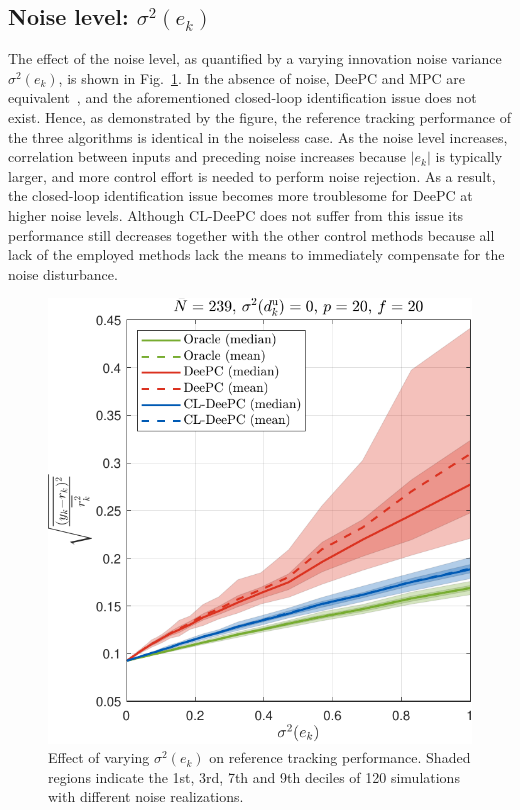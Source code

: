 \subsection{Noise level: $\sigma^2(e_k)$}
\noindent The effect of the noise level, as quantified by a varying innovation noise variance $\sigma^2(e_k)$, is shown in Fig.~\ref{fig:varying_Re}. In the absence of noise, \ac{DeePC} and \ac{MPC} are equivalent~\cite{Coulson2019}, and the aforementioned closed-loop identification issue does not exist. Hence, as demonstrated by the figure, the reference tracking performance of the three algorithms is identical in the noiseless case. As the noise level increases, correlation between inputs and preceding noise increases because $|e_k|$ is typically larger, and more control effort is needed to perform noise rejection. As a result, the closed-loop identification issue becomes more troublesome for \ac{DeePC} at higher noise levels. Although \ac{CL-DeePC} does not suffer from this issue its performance still decreases together with the other control methods because all lack of the employed methods lack the means to immediately compensate for the noise disturbance.
\begin{figure}[t!]
\begin{center}
\includegraphics[width=\columnwidth]{results/figures/Varying_Re_0.0001-1-50_Nbar_239_p_20_f_20_Ru_1_Rdu_0_Q_100_R_0_dR_10.pdf}    %
\caption{Effect of varying $\sigma^2(e_k)$ on reference tracking performance. Shaded regions indicate the 1st, 3rd, 7th and 9th deciles of 120 simulations with different noise realizations.}  %
\label{fig:varying_Re}                                 %
\end{center}                                 %
\end{figure}

